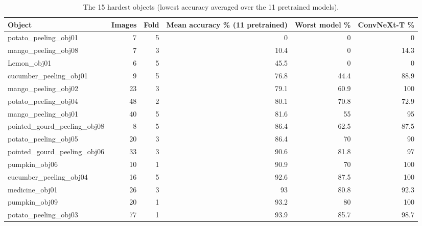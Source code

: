 \begin{table}[!htbp]
\centering
\scriptsize
\caption{The 15 hardest objects (lowest accuracy averaged over the 11 pretrained models).}
\label{tab:s_hardest}
\begin{adjustbox}{max width=\textwidth}
\begin{tabular}{@{}lrrrrr@{}}
\toprule
Object & Images & Fold & Mean accuracy \% (11 pretrained) & Worst model \% & ConvNeXt-T \% \\
\midrule
potato\_peeling\_obj01 & 7 & 5 & 0 & 0 & 0 \\
mango\_peeling\_obj08 & 7 & 3 & 10.4 & 0 & 14.3 \\
Lemon\_obj01 & 6 & 5 & 45.5 & 0 & 0 \\
cucumber\_peeling\_obj01 & 9 & 5 & 76.8 & 44.4 & 88.9 \\
mango\_peeling\_obj02 & 23 & 3 & 79.1 & 60.9 & 100 \\
potato\_peeling\_obj04 & 48 & 2 & 80.1 & 70.8 & 72.9 \\
mango\_peeling\_obj01 & 40 & 5 & 81.6 & 55 & 95 \\
pointed\_gourd\_peeling\_obj08 & 8 & 5 & 86.4 & 62.5 & 87.5 \\
potato\_peeling\_obj05 & 20 & 3 & 86.4 & 70 & 90 \\
pointed\_gourd\_peeling\_obj06 & 33 & 3 & 90.6 & 81.8 & 97 \\
pumpkin\_obj06 & 10 & 1 & 90.9 & 70 & 100 \\
cucumber\_peeling\_obj04 & 16 & 5 & 92.6 & 87.5 & 100 \\
medicine\_obj01 & 26 & 3 & 93 & 80.8 & 92.3 \\
pumpkin\_obj09 & 20 & 1 & 93.2 & 80 & 100 \\
potato\_peeling\_obj03 & 77 & 1 & 93.9 & 85.7 & 98.7 \\
\bottomrule
\end{tabular}
\end{adjustbox}
\end{table}
